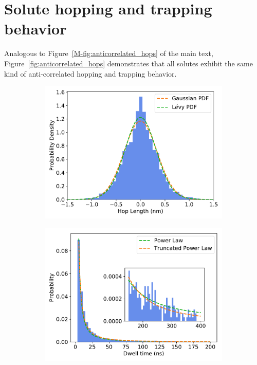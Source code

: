 \documentclass{article}
\begin{document}
  \newpage
  
  \section{Solute hopping and trapping behavior}\label{section:sfbm_other_solutes}
  
  Analogous to Figure~\ref{M-fig:anticorrelated_hops} of the main text,
  Figure~\ref{fig:anticorrelated_hops} demonstrates that all solutes exhibit the
  same kind of anti-correlated hopping and trapping behavior.
  
  \begin{figure}[h]
  \centering
  \begin{subfigure}{0.3\textwidth}
  \includegraphics[width=\textwidth]{gaussian_levy_comparison_anomalous_GCL.pdf}
  \caption{}\label{fig:GCL_hop_distribution_comparison}
  \end{subfigure}
  \begin{subfigure}{0.3\textwidth}
  \includegraphics[width=\textwidth]{GCL_powerlaw.pdf}

\end{subfigure}
\end{figure}
\end{document}
